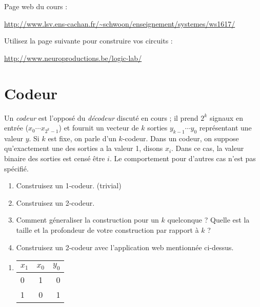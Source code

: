 \documentclass[11pt]{article}
\newcommand{\numtd}{03}
\newcommand{\titretd}{Circuits logiques}
\begin{document}
\entete{\numtd}{\titretd}

\begin{introduction}
 Page web du cours :
 \begin{center}
  \url{http://www.lsv.ens-cachan.fr/~schwoon/enseignement/systemes/ws1617/}
 \end{center}

 Utilisez la page suivante pour construire vos circuits :
 \begin{center}
  \url{http://www.neuroproductions.be/logic-lab/}
 \end{center}
\end{introduction}

\section{Codeur}

Un \emph{codeur} est l'opposé du \emph{décodeur} discuté en cours ;
il prend $2^k$ signaux en entrée ($x_0\cdots x_{2^k-1}$) et fournit un
vecteur de $k$ sorties $y_{k-1}\cdots y_0$ représentant une valeur $y$.
Si $k$ est fixe, on parle d'un $k$-codeur.
Dans un codeur, on suppose qu'exactement une des sorties a la valeur 1,
disons $x_i$. Dans ce cas, la valeur binaire des sorties est censé être $i$.
Le comportement pour d'autres cas n'est pas spécifié.

\begin{enumerate}
 \item Construisez un 1-codeur. (trivial)
 \item Construisez un 2-codeur.
 \item Comment géneraliser la construction pour un $k$ quelconque ?
	Quelle est la taille et la profondeur de votre construction
	par rapport à $k$ ?
 \item Construisez un 2-codeur avec l'application web mentionnée ci-dessus.
\end{enumerate}

\begin{solution}
 \begin{enumerate}
  \item
 \begin{tabular}{|l|c|r|}
  \hline
  $x_1$ & $x_0$ & $y_0$ \\
  \hline
  0 & 1 & 0 \\
  1 & 0 & 1 \\
  \hline
 \end{tabular}
 \end{enumerate}
\end{solution}
\end{document}
